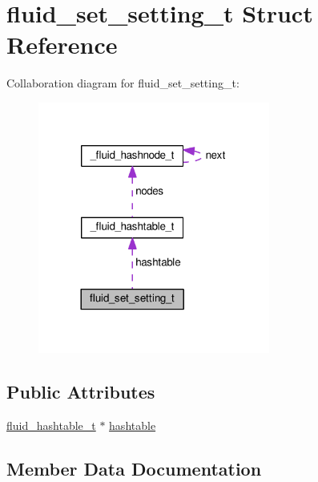 \hypertarget{structfluid__set__setting__t}{}\section{fluid\+\_\+set\+\_\+setting\+\_\+t Struct Reference}
\label{structfluid__set__setting__t}


Collaboration diagram for fluid\+\_\+set\+\_\+setting\+\_\+t\+:
\nopagebreak
\begin{figure}[H]
\begin{center}
\leavevmode
\includegraphics[width=216pt]{structfluid__set__setting__t__coll__graph}
\end{center}
\end{figure}
\subsection*{Public Attributes}
\begin{DoxyCompactItemize}
\item 
\hyperlink{fluidsynth__priv_8h_a6cd032fa96f8ec0d47a5ba1a96f2f6c9}{fluid\+\_\+hashtable\+\_\+t} $\ast$ \hyperlink{structfluid__set__setting__t_a14633d8ab632f94a5d8362347a8639e3}{hashtable}
\end{DoxyCompactItemize}


\subsection{Member Data Documentation}
\mbox{\label{structfluid__set__setting__t_a14633d8ab632f94a5d8362347a8639e3}} 
